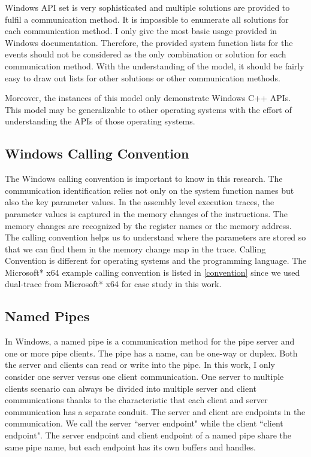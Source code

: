 Windows API set is very sophisticated and multiple solutions are provided to fulfil a communication method. It is impossible to enumerate all solutions for each communication method. I only give the most basic usage provided in Windows documentation. Therefore, the provided system function lists for the events should not be considered as the only combination or solution for each communication method. With the understanding of the model, it should be fairly easy to draw out lists for other solutions or other communication methods. 

Moreover, the instances of this model only demonstrate Windows C++ APIs. This model may be generalizable to other operating systems with the effort of understanding the APIs of those operating systems.

\subsection{Windows Calling Convention}
The Windows calling convention is important to know in this research. The communication identification relies not only on the system function names but also the key parameter values. In the assembly level execution traces, the parameter values is captured in the memory changes of the instructions. The memory changes are recognized by the register names or the memory address. The calling convention helps us to understand where the parameters are stored so that we can find them in the memory change map in the trace. Calling Convention is different for operating systems and the programming language. The Microsoft* x64 example calling convention is listed in \ref{convention} since we used dual-trace from Microsoft* x64 for case study in this work.

\subsection{Named Pipes}
In Windows, a named pipe is a communication method for the pipe server and one or more pipe clients. The pipe has a name, can be one-way or duplex. Both the server and clients can read or write into the pipe.\cite{WinNamedpipe} In this work, I only consider one server versus one client communication. One server to multiple clients scenario can always be divided into multiple server and client communications thanks to the characteristic that each client and server communication has a separate conduit. The server and client are endpoints in the communication. We call the server ``server endpoint" while the client ``client endpoint".  The server endpoint and client endpoint of a named pipe share the same pipe name, but each endpoint has its own buffers and handles. 

